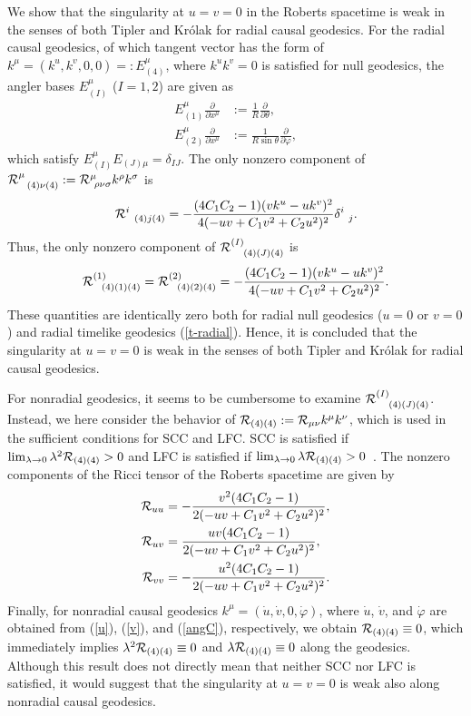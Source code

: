 \documentclass[aps,prd,twocolumn,eqsecnum,showpacs,amsmath]{revtex4}
\begin{document}
We show that the singularity at $u=v=0$ in the Roberts spacetime is weak in the senses of both Tipler and Kr\'{o}lak for radial causal geodesics.
For the radial causal geodesics, of which tangent vector has the form of $k^\mu=(k^u,k^v,0,0)=:E^\mu_{(4)}$, where $k^u k^v=0$ is satisfied for null geodesics, the angler bases $E^\mu_{(I)}$ ($I=1,2$) are given as
\begin{align}
E^\mu_{(1)}\frac{\partial}{\partial x^\mu}&:=\frac{1}{R}\frac{\partial}{\partial \theta},\\
E^\mu_{(2)}\frac{\partial}{\partial x^\mu}&:=\frac{1}{R\sin\theta}\frac{\partial}{\partial \varphi},
\end{align}  
which satisfy $E^\mu_{(I)}E_{(J)\mu}=\delta_{IJ}$.
The only nonzero component of ${\cal R}^{\mu}_{~~(4)\nu(4)}:={\cal R}^{\mu}_{~\rho\nu\sigma}k^\rho k^\sigma$ is
\begin{align}
{\cal R}^{i}_{~~(4)j(4)}=-\frac{(4C_1C_2-1)(vk^u-uk^v)^2}{4(-uv+C_1v^2+C_2u^2)^2}\delta^i_{~~j}.
\end{align}  
Thus, the only nonzero component of ${\cal R}^{(I)}_{~~~(4)(J)(4)}$ is 
\begin{align}
{\cal R}^{(1)}_{~~(4)(1)(4)}={\cal R}^{(2)}_{~~(4)(2)(4)}=-\frac{(4C_1C_2-1)(vk^u-uk^v)^2}{4(-uv+C_1v^2+C_2u^2)^2}.
\end{align}  
These quantities are identically zero both for radial null geodesics ($u=0$ or $v=0$) and radial timelike geodesics (\ref{t-radial}).
Hence, it is concluded that the singularity at $u=v=0$ is weak in the senses of both Tipler and Kr\'{o}lak for radial causal geodesics.

For nonradial geodesics, it seems to be cumbersome to examine ${\cal R}^{(I)}_{~~~(4)(J)(4)}$.
Instead, we here consider the behavior of ${\cal R}_{(4)(4)}:={\cal R}_{\mu\nu}k^\mu k^\nu$, which is used in the sufficient conditions for SCC and LFC.
SCC is satisfied if $\lim_{\lambda \to 0}\lambda^2{\cal R}_{(4)(4)}>0$ and LFC is satisfied if $\lim_{\lambda \to 0}\lambda {\cal R}_{(4)(4)}>0$~\cite{ClarkeKrolak,Clarketext}. 
The nonzero components of the Ricci tensor of the Roberts spacetime are given by
\begin{align}
{\cal R}_{uu}&=-\frac{v^2(4C_1C_2-1)}{2(-uv+C_1v^2+C_2u^2)^2},\\
{\cal R}_{uv}&=\frac{uv(4C_1C_2-1)}{2(-uv+C_1v^2+C_2u^2)^2},\\
{\cal R}_{vv}&=-\frac{u^2(4C_1C_2-1)}{2(-uv+C_1v^2+C_2u^2)^2}.
\end{align}  
Finally, for nonradial causal geodesics $k^\mu=({\dot u},{\dot v},0,{\dot \varphi})$, where ${\dot u}$, ${\dot v}$, and ${\dot \varphi}$ are obtained from (\ref{u}), (\ref{v}), and (\ref{angC}), respectively, we obtain ${\cal R}_{(4)(4)}\equiv 0$, which immediately implies $\lambda^2 {\cal R}_{(4)(4)} \equiv 0$ and $\lambda {\cal R}_{(4)(4)} \equiv 0$ along the geodesics.
Although this result does not directly mean that neither SCC nor LFC is satisfied, it would suggest that the singularity at $u=v=0$ is weak also along nonradial causal geodesics.
\end{document}
